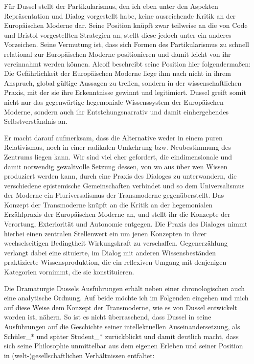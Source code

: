 Für Dussel stellt der Partikularismus, den ich eben unter den Aspekten
Repräsentation und Dialog vorgestellt habe, keine ausreichende Kritik an der
Europäischen Moderne dar. Seine Position knüpft zwar teilweise an die von Code
und Bristol vorgestellten Strategien an, stellt diese jedoch unter ein anderes
Vorzeichen. Seine Vermutung ist, dass sich Formen des Partikularismus zu schnell
relational zur Europäischen Moderne positionieren und damit leicht von ihr
vereinnahmt werden können. Alcoff beschreibt seine Position hier folgendermaßen:
Die Gefährlichkeit der Europäischen Moderne liege ihm nach nicht in ihrem
Anspruch, global gültige Aussagen zu treffen, sondern in der wissenschaftlichen
Praxis, mit der sie ihre Erkenntnisse gewinnt und legitimiert.\footnotemark
{} Dussel greift somit nicht
nur das gegenwärtige hegemoniale Wissenssystem der Europäischen Moderne, sondern
auch ihr Entstehungsnarrativ und damit einhergehendes Selbstverständnis an.

Er macht darauf aufmerksam, dass die Alternative weder in einem puren
Relativismus, noch in einer radikalen Umkehrung bzw. Neubestimmung des Zentrums
liegen kann. Wir sind viel eher gefordert, die eindimensionale und damit
notwendig gewaltvolle Setzung dessen, von wo aus über wen Wissen produziert
werden kann, durch eine Praxis des Dialoges zu unterwandern, die verschiedene
epistemische Gemeinschaften verbindet und so dem Universalismus der Moderne ein
Pluriversalismus der Transmoderne gegenüberstellt. Das Konzept der Transmoderne
knüpft an die Kritik an der hegemonialen Erzählpraxis der Europäischen Moderne
an, und stellt ihr die Konzepte der Verortung, Exteriorität und Autonomie
entgegen. Die Praxis des Dialoges nimmt hierbei einen zentralen Stellenwert ein
um jenen Konzepten in ihrer wechselseitigen Bedingtheit Wirkungskraft zu
verschaffen. Gegenerzählung verlangt dabei eine situierte, im Dialog mit anderen
Wissensbeständen praktizierte Wissensproduktion, die ein reflexiven Umgang mit
denjenigen Kategorien vornimmt, die sie konstituieren.

Die Dramaturgie Dussels Ausführungen erhält neben einer chronologischen auch
eine analytische Ordnung. Auf beide möchte ich im Folgenden eingehen und mich
auf diese Weise dem Konzept der Transmoderne, wie es von Dussel entwickelt
worden ist, nähern. So ist es nicht überraschend, dass Dussel in seine
Ausführungen auf die Geschichte seiner intellektuellen Auseinandersetzung, als
Schüler\_* und später Student\_* zurückblickt und damit deutlich macht, dass sich
seine Philosophie unmittelbar aus dem eigenen Erleben und seiner Position in
(welt-)gesellschaftlichen Verhältnissen entfaltet:\footnotemark {}

